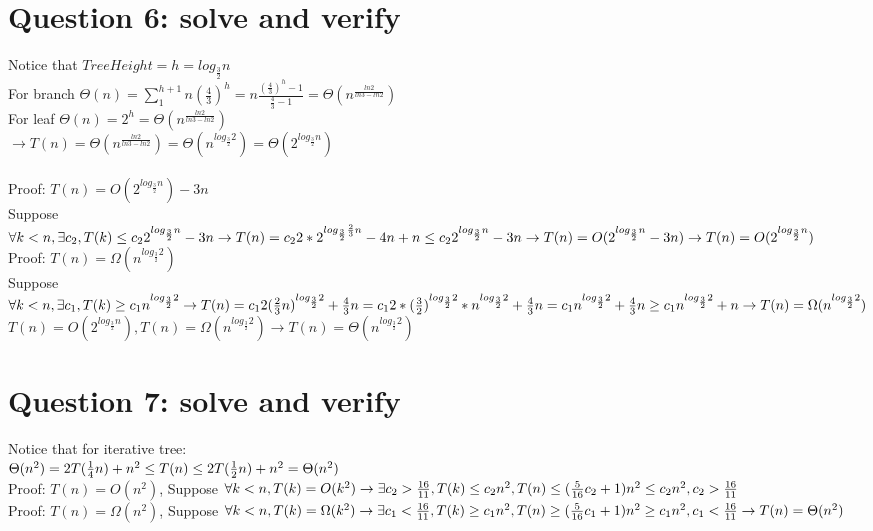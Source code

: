 \documentclass[]{article}
\begin{document}
\section{Question 6: solve and verify}
Notice that $TreeHeight=h = log_{\frac{3}{2}}n$\\
For branch $\Theta(n) = \sum _{1}^{h + 1} n(\frac{4}{3})^h = n\frac{(\frac{4}{3})^h - 1}{\frac{4}{3} - 1} = \Theta(n^{\frac{ln2}{ln3-ln2}})$\\
For leaf $\Theta(n) = 2^h = \Theta(n^{\frac{ln2}{ln3-ln2}})$\\
$\rightarrow T(n) = \Theta(n^{\frac{ln2}{ln3-ln2}}) = \Theta(n^{log_{\frac{3}{2}}2}) = \Theta(2^{log_{\frac{3}{2}}n})$\\
\\
Proof: $ T(n) = O(2^{log_{\frac{3}{2}}n}) - 3n$ \\
Suppose $\forall k<n, \exists c_{2}, T(k) \le c_{2}2^{log_{\frac{3}{2}}n} - 3n\\
\rightarrow T(n) = c_{2}2*2^{log_{\frac{3}{2}}\frac{2}{3}n} -4n + n \le c_{2}2^{log_{\frac{3}{2}}n} -3n\\
\rightarrow T(n) =  O(2^{log_{\frac{3}{2}}n} -3n)\\
\rightarrow T(n) =  O(2^{log_{\frac{3}{2}}n})\\$
\\
Proof: $ T(n) = \Omega(n^{log_{\frac{3}{2}}2})$ \\
Suppose $\forall k<n, \exists c_{1}, T(k) \ge c_{1}n^{log_{\frac{3}{2}}2}\\
\rightarrow T(n) = c_{1}2(\frac{2}{3}n)^{log_{\frac{3}{2}}2} + \frac{4}{3}n
 = c_{1}2*(\frac{3}{2})^{log_{\frac{3}{2}}2}*n^{log_{\frac{3}{2}}2} + \frac{4}{3}n = c_{1}n^{log_{\frac{3}{2}}2} + \frac{4}{3}n \ge c_{1}n^{log_{\frac{3}{2}}2} + n\\
\rightarrow T(n) = \Omega(n^{log_{\frac{3}{2}}2})\\$
\\
$T(n) =  O(2^{log_{\frac{3}{2}}n}), T(n) = \Omega(n^{log_{\frac{3}{2}}2}) \rightarrow T(n) = \Theta(n^{log_{\frac{3}{2}}2})$
\section{Question 7: solve and verify}

Notice that for iterative tree: \\
$\Theta (n^2) = 2T(\frac{1}{4}n) + n^2 \le T(n) \le 2T(\frac{1}{2}n) + n^2 = \Theta (n^2)\\$
\\
Proof: $T(n) = O(n^2)$, Suppose $\forall k < n, T(k) = O(k^2)\\
\rightarrow \exists c_{2}>\frac{16}{11}, T(k) \le c_{2}n^2, T(n) \le (\frac{5}{16}c_{2} + 1)n^{2} \le c_{2}n^2, c_{2}>\frac{16}{11} \\$
\\
Proof: $T(n) = \Omega(n^2)$, Suppose $\forall k < n, T(k) = \Omega(k^2)\\
\rightarrow \exists c_{1}<\frac{16}{11}, T(k) \ge c_{1}n^2, T(n) \ge (\frac{5}{16}c_{1} + 1)n^{2} \ge c_{1}n^2, c_{1}<\frac{16}{11} \\
\rightarrow T(n) = \Theta(n^2)$\\
\end{document}
